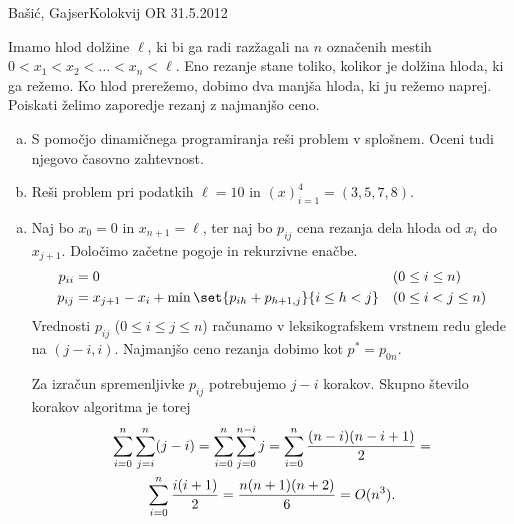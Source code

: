 \begin{naloga}{Bašić, Gajser}{Kolokvij OR 31.5.2012}
\begin{vprasanje}
Imamo hlod dolžine $\ell$,
ki bi ga radi razžagali na $n$ označenih mestih
$0 < x_1 < x_2 < \dots < x_n < \ell$.
Eno rezanje stane toliko, kolikor je dolžina hloda, ki ga režemo.
Ko hlod prerežemo, dobimo dva manjša hloda, ki ju režemo naprej.
Poiskati želimo zaporedje rezanj z najmanjšo ceno.
\begin{enumerate}[(a)]
\item S pomočjo dinamičnega programiranja reši problem v splošnem.
Oceni tudi njegovo časovno zahtevnost.
\item Reši problem pri podatkih $\ell = 10$ in $(x)_{i=1}^4 = (3, 5, 7, 8)$.
\end{enumerate}
\end{vprasanje}

\begin{odgovor}
\begin{enumerate}[(a)]
\item Naj bo $x_0 = 0$ in $x_{n+1} = \ell$,
ter naj bo $p_{ij}$ cena rezanja dela hloda od $x_i$ do $x_{j+1}$.
Določimo začetne pogoje in rekurzivne enačbe.
\begin{align*}
p_{ii} &= 0 && (0 \le i \le n) \\
p_{ij} &= x_{j+1} - x_i + \min\set{p_{ih} + p_{h+1,j}}{i \le h < j}
&& (0 \le i < j \le n)
\end{align*}
Vrednosti $p_{ij}$ ($0 \le i \le j \le n$)
računamo v leksikografskem vrstnem redu glede na $(j-i, i)$.
Najmanjšo ceno rezanja dobimo kot $p^* = p_{0n}$.

Za izračun spremenljivke $p_{ij}$ potrebujemo $j-i$ korakov.
Skupno število korakov algoritma je torej
\begin{multline*}
\sum_{i=0}^n \sum_{j=i}^n (j-i) = \sum_{i=0}^n \sum_{j=0}^{n-i} j =
\sum_{i=0}^n {(n-i)(n-i+1) \over 2} = \\
\sum_{i=0}^n {i(i+1) \over 2} = {n(n+1)(n+2) \over 6} = O(n^3) .
\end{multline*}


\end{enumerate}
\end{odgovor}
\end{naloga}
